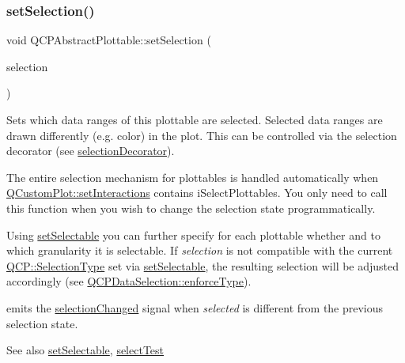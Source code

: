 \subsubsection{\texorpdfstring{set\+Selection()}{setSelection()}}
{\footnotesize\ttfamily void Q\+C\+P\+Abstract\+Plottable\+::set\+Selection (\begin{DoxyParamCaption}\item[{\hyperlink{class_q_c_p_data_selection}{Q\+C\+P\+Data\+Selection}}]{selection }\end{DoxyParamCaption})}

Sets which data ranges of this plottable are selected. Selected data ranges are drawn differently (e.\+g. color) in the plot. This can be controlled via the selection decorator (see \hyperlink{class_q_c_p_abstract_plottable_a7861518e47ca0c6a0c386032c2db075e}{selection\+Decorator}).

The entire selection mechanism for plottables is handled automatically when \hyperlink{class_q_custom_plot_a5ee1e2f6ae27419deca53e75907c27e5}{Q\+Custom\+Plot\+::set\+Interactions} contains i\+Select\+Plottables. You only need to call this function when you wish to change the selection state programmatically.

Using \hyperlink{class_q_c_p_abstract_plottable_ac238d6e910f976f1f30d41c2bca44ac3}{set\+Selectable} you can further specify for each plottable whether and to which granularity it is selectable. If {\itshape selection} is not compatible with the current \hyperlink{namespace_q_c_p_ac6cb9db26a564b27feda362a438db038}{Q\+C\+P\+::\+Selection\+Type} set via \hyperlink{class_q_c_p_abstract_plottable_ac238d6e910f976f1f30d41c2bca44ac3}{set\+Selectable}, the resulting selection will be adjusted accordingly (see \hyperlink{class_q_c_p_data_selection_a17b84d852911531d229f4a76aa239a75}{Q\+C\+P\+Data\+Selection\+::enforce\+Type}).

emits the \hyperlink{class_q_c_p_abstract_plottable_a3af66432b1dca93b28e00e78a8c7c1d9}{selection\+Changed} signal when {\itshape selected} is different from the previous selection state.

\begin{DoxySeeAlso}{See also}
\hyperlink{class_q_c_p_abstract_plottable_ac238d6e910f976f1f30d41c2bca44ac3}{set\+Selectable}, \hyperlink{class_q_c_p_abstract_plottable_a38efe9641d972992a3d44204bc80ec1d}{select\+Test} 
\end{DoxySeeAlso}
\mbox{\label{class_q_c_p_abstract_plottable_a20e266ad646f8c4a7e4631040510e5d9}} 
